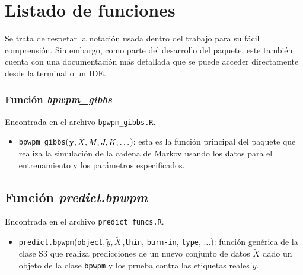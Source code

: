 \documentclass[../../Main/Main.tex]{subfiles}
\begin{document}
\section{Listado de funciones}
Se trata de respetar la notación usada dentro del trabajo para su fácil comprensión. Sin embargo, como parte del desarrollo del paquete, este también cuenta con una documentación más detallada que se puede acceder directamente desde la terminal o un IDE. 

\subsubsection*{Función \textit{bpwpm\_gibbs}}
Encontrada en el archivo \verb|bpwpm_gibbs.R|.
\begin{itemize}[label={}]
	\item \verb|bpwpm_gibbs|($\mathbf{y},X,M,J,K,\ldots$): esta es la función principal del paquete que realiza la simulación de la cadena de Markov usando los datos para el entrenamiento y los parámetros especificados.
\end{itemize}

\subsection*{Función \textit{predict.bpwpm}}
Encontrada en el archivo \verb|predict_funcs.R|.
\begin{itemize}[label={}]
	\item \verb|predict.bpwpm|(\verb|object|,$\,\tilde{y},\tilde{X\,}$,\verb|thin|, \verb|burn-in|, \verb|type|, $\ldots$): función genérica de la clase S3 que realiza predicciones de un nuevo conjunto de datos $\tilde{X}$ dado un objeto de la clase \verb|bpwpm| y los prueba contra las etiquetas reales $\tilde{y}$.
\end{itemize}
\end{document}

